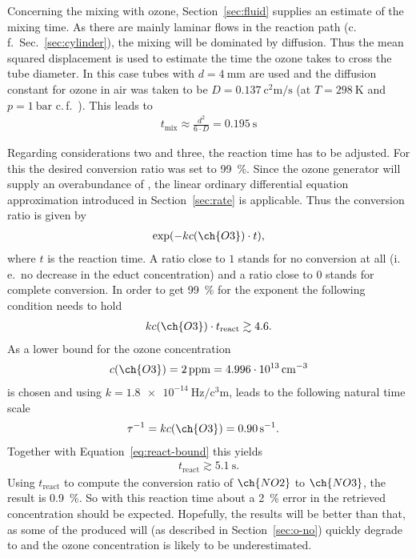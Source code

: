 Concerning the mixing with ozone, Section~\ref{sec:fluid} supplies an
estimate of the mixing time. As there are mainly laminar flows in the
reaction path (c.\,f.\ Sec.~\ref{sec:cylinder}), the mixing will be
dominated by diffusion. Thus the mean squared displacement is used to
estimate the time the ozone takes to cross the tube diameter. In this
case tubes with $d = \SI{4}{\milli\meter}$ are used and the diffusion
constant for ozone in air was taken to be
$D = \SI{0.137}{\square\centi\meter\per\second}$ (at
$T = \SI{298}{\kelvin}$ and $p = \SI{1}{\text{bar}}$
c.\,f.~\cite{diff-ozone}). This leads to
\begin{align*}
  t_{\text{mix}} \approx \frac{d^2}{6\cdot D} = \SI{0.195}{\second}
\end{align*}

Regarding considerations two and three, the reaction time has to
be adjusted. For this the desired conversion ratio was set to
\SI{99}{\%}. Since the ozone generator will supply an overabundance of
, the linear ordinary differential equation approximation
introduced in Section~\ref{sec:rate} is applicable. Thus the
conversion ratio is given by
\begin{align*}
  \exp(-kc(\ch{O3})\cdot t),
\end{align*}
where $t$ is the reaction time. A ratio close to $1$ stands for no
conversion at all (i.\,e.\ no decrease in the educt concentration) and
a ratio close to $0$ stands for complete conversion. In order to get
\SI{99}{\%} for the exponent the following condition needs to hold
\begin{align}
  kc(\ch{O3}) \cdot t_{\text{react}} \gtrsim 4.6. \label{eq:react-bound}
\end{align}
As a lower bound for the ozone concentration 
\begin{align*}
  c(\ch{O3}) = \SI{2}{ppm} = \SI{4.996e13}{\per\cubic\centi\meter} 
\end{align*}
is chosen and using $k = \SI{1.8e-14}{\hertz\per\cubic\centi\meter}$,
leads to the following natural time scale
\begin{align*}
  \tau^{-1} & = k c(\ch{O3}) = \SI{0.90}{\per\second}.
\end{align*}
Together with Equation~\eqref{eq:react-bound} this yields
\begin{align*}
  t_{\text{react}} \gtrsim \SI{5.1}{\second}.
\end{align*}
Using $t_{\text{react}}$ to compute the conversion ratio of $\ch{NO2}$
to $\ch{NO3}$, the result is \SI{0.9}{\%}. So with this reaction time
about a \SI{2}{\%} error in the retrieved  concentration should
be expected. Hopefully, the results will be better than that, as some
of the produced  will (as described in Section~\ref{sec:o-no})
quickly degrade to  and the ozone concentration is likely to
be underestimated.

